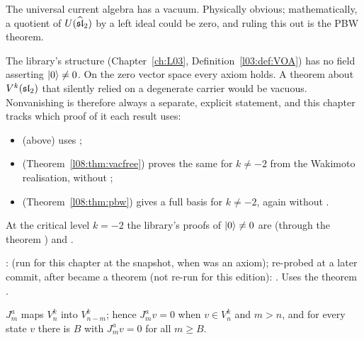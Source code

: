 \begin{physics}
The universal current algebra has a vacuum. Physically obvious; mathematically, a quotient of
$U(\widehat{\mathfrak{sl}}_2)$ by a left ideal could be zero, and ruling this out is the PBW theorem.
\end{physics}

\begin{warning}[title={The zero module satisfies every VOA axiom}]
The library's  structure (Chapter~\ref{ch:L03},
Definition~\ref{l03:def:VOA}) has no field asserting $|0\rangle\ne0$. On the zero vector space every
axiom holds. A theorem about $V^k(\mathfrak{sl}_2)$ that silently relied on a degenerate carrier would be
vacuous. Nonvanishing is therefore always a separate, explicit statement, and this chapter tracks
which proof of it each result uses:
\begin{itemize}
\item {}\allowbreak{}\allowbreak{}\allowbreak{} (above) uses ;
\item {}\allowbreak{}\allowbreak{}\allowbreak{}\allowbreak{} (Theorem~\ref{l08:thm:vacfree}) proves the same for $k\ne-2$ from
  the Wakimoto realisation, without ;
\item {}\allowbreak{} (Theorem~\ref{l08:thm:pbw}) gives a full
  basis for $k\ne-2$, again without .
\end{itemize}
At the critical level $k=-2$ the library's proofs of $|0\rangle\ne0$ are  (through the theorem
) and .
\end{warning}

\begin{status}
\allowbreak{}\allowbreak{}\allowbreak{}\allowbreak{}: \lean{[propext, Classical.}\allowbreak{}\allowbreak{}\allowbreak\lean{pbw]} (run for
this chapter at the snapshot, when  was an axiom); re-probed at a later commit, after  became a theorem (not re-run for this edition):
. Uses the theorem .
\end{status}

\begin{proposition}\label{l08:prop:Jgrading}
$J^a_m$ maps $V^k_n$ into $V^k_{n-m}$; hence $J^a_m v = 0$ when $v\in V^k_n$ and $m>n$, and for every
state $v$ there is $B$ with $J^a_mv=0$ for all $m\ge B$.
\end{proposition}

